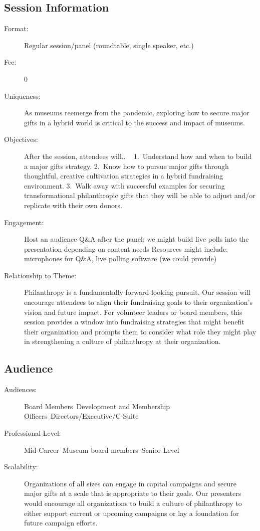 \documentclass{report}
\begin{document}
              \subsection*{Session Information}
                \begin{description}
                  \item [Format:] Regular session/panel (roundtable, single speaker, etc.)
							    
								  \item [Fee:]0
							     
							    \item [Uniqueness:]As museums reemerge from the pandemic, exploring how to secure major gifts in a hybrid world is critical to the success and impact of museums.
							    \item [Objectives:]After the session, attendees will..
 
1. Understand how and when to build a major gifts strategy.
2. Know how to pursue major gifts through thoughtful, creative cultivation strategies in a hybrid fundraising environment.
3. Walk away with successful examples for securing transformational philanthropic gifts that they will be able to adjust and/or replicate with their own donors.
							    \item [Engagement:]Host an audience Q\&A after the panel; we might build live polls into the presentation depending on content needs
Resources might include: microphones for Q\&A, live polling software (we could provide)
							    \item [Relationship to Theme:]Philanthropy is a fundamentally forward-looking pursuit. Our session will encourage attendees to align their fundraising goals to their organization's vision and future impact. For volunteer leaders or board members, this session provides a window into fundraising strategies that might benefit their organization and prompts them to consider what role they might play in strengthening a culture of philanthropy at their organization.
							    
                \end{description}
              \subsection*{Audience}
                \begin{description}
                  \item [Audiences:]Board Members~Development and Membership Officers~Directors/Executive/C-Suite~
                  \item[Professional Level:]Mid-Career~Museum board members~Senior Level~
                \item[Scalability:] Organizations of all sizes can engage in capital campaigns and secure major gifts at a scale that is appropriate to their goals. Our presenters would encourage all organizations to build a culture of philanthropy to either support current or upcoming campaigns or lay a foundation for future campaign efforts.

							
              \end{description}
\end{document}
